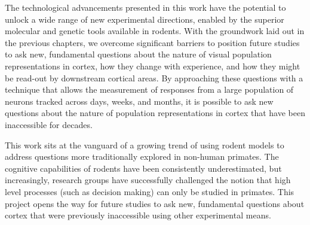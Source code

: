The technological advancements presented in this work have the potential to unlock a wide range of new experimental directions, enabled by the superior molecular and genetic tools available in rodents. With the groundwork laid out in the previous chapters, we overcome significant barriers to position future studies to ask new, fundamental questions about the nature of visual population representations in cortex, how they change with experience, and how they might be read-out by downstream cortical areas. By approaching these questions with a technique that allows the measurement of responses from a large population of neurons tracked across days, weeks, and months, it is possible to ask new questions about the nature of population representations in cortex that have been inaccessible for decades.

This work sits at the vanguard of a growing trend of using rodent models to address questions more traditionally explored in non-human primates.  The cognitive capabilities of rodents have been consistently underestimated, but increasingly, research groups have successfully challenged the notion that high level processes (such as decision making) can only be studied in primates. This project opens the way for future studies to ask new, fundamental questions about cortex that were previously inaccessible using other experimental means. 